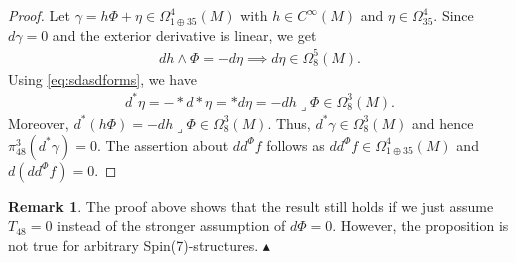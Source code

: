 \documentclass[10pt,a4paper,reqno]{article}
\newtheorem{proposition}[theorem]{Proposition}
\theoremstyle{definition}
\newtheorem{remark}[theorem]{Remark}
\numberwithin{equation}{section}
\def\ddphi{dd^{\Phi}}
\newcommand\xqed[1]{%
	\leavevmode\unskip\penalty9999 \hbox{}\nobreak\hfill
	\quad\hbox{#1}}
\newcommand\demo{\xqed{$\blacktriangle$}}
\begin{document}
\begin{proof}
Let $\gamma=h\Phi + \eta \in \Omega^4_{1\oplus 35}(M)$ with $h\in C^{\infty}(M)$ and $\eta\in \Omega^4_{35}$. Since $d\gamma=0$ and the exterior derivative is linear, we get
\begin{align*}
dh\wedge \Phi = -d\eta \implies d\eta \in \Omega^5_8(M).
\end{align*}
Using \cref{eq:sdasdforms}, we have 
\begin{align*}
d^*\eta =-*d*\eta=*d\eta = -dh\lrcorner \Phi \in \Omega^3_8(M).   
\end{align*}
Moreover, $d^*(h\Phi)=-dh\lrcorner \Phi \in \Omega^3_8(M)$. Thus, $d^*\gamma \in \Omega^3_8(M)$ and hence $\pi^3_{48}(d^*\gamma)=0$. The assertion about $\ddphi f$ follows as $\ddphi f\in \Omega^4_{1\oplus 35}(M)$ and $d(\ddphi f)=0$.
\end{proof}

\begin{remark}
The proof above shows that the result still holds if we just assume $T_{48}=0$ instead of the  stronger assumption of $d\Phi=0$. However, the proposition is not true for arbitrary Spin(7)-structures. \demo
\end{remark}


\end{document}
